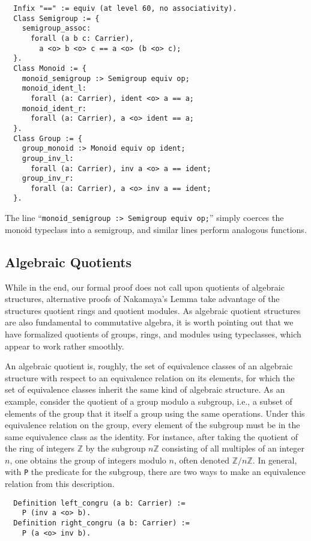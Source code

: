 \documentclass{article}
\begin{document}
\begin{verbatim}
  Infix "==" := equiv (at level 60, no associativity).
  Class Semigroup := {
    semigroup_assoc:
      forall (a b c: Carrier),
        a <o> b <o> c == a <o> (b <o> c);
  }.
  Class Monoid := {
    monoid_semigroup :> Semigroup equiv op;
    monoid_ident_l:
      forall (a: Carrier), ident <o> a == a;
    monoid_ident_r:
      forall (a: Carrier), a <o> ident == a;
  }.
  Class Group := {
    group_monoid :> Monoid equiv op ident;
    group_inv_l:
      forall (a: Carrier), inv a <o> a == ident;
    group_inv_r:
      forall (a: Carrier), a <o> inv a == ident;
  }.
\end{verbatim}
The line  ``\verb|monoid_semigroup :> Semigroup equiv op;|'' simply coerces
the monoid typeclass into a semigroup, and similar lines perform analogous functions.


\subsection{Algebraic Quotients}
While in the end, our formal proof does not call upon quotients of
algebraic structures, alternative proofs of Nakamaya's Lemma take advantage of 
 the structures quotient rings and quotient modules.  As algebraic 
 quotient structures are also fundamental to commutative algebra,
it is worth pointing out that we have formalized quotients of groups, rings, and modules 
  using typeclasses, which appear to work rather smoothly. 

An algebraic quotient is, roughly, the set of equivalence classes of an
algebraic structure with respect to an equivalence relation on its elements,
for which the set of equivalence classes inherit the same kind of algebraic
structure. 
As an example, consider the quotient of a group modulo a subgroup,
i.e., a subset of elements of the group that it itself a group using the same operations. 
Under this equivalence relation on the group, every element of the
subgroup must be in the same equivalence class as the identity. 
For instance, after taking the quotient of the ring of integers $\mathbb{Z}$ by the
subgroup $n \mathbb{Z}$ consisting of all multiples of an integer $n$, one obtains the
group of integers modulo $n$, often denoted $\mathbb{Z}/n\mathbb{Z}$.
In general, with \texttt{P}
the predicate for the subgroup, there are two ways to make an equivalence
relation from this description.

\begin{verbatim}
  Definition left_congru (a b: Carrier) :=
    P (inv a <o> b).
  Definition right_congru (a b: Carrier) :=
    P (a <o> inv b).
\end{verbatim}
\end{document}
